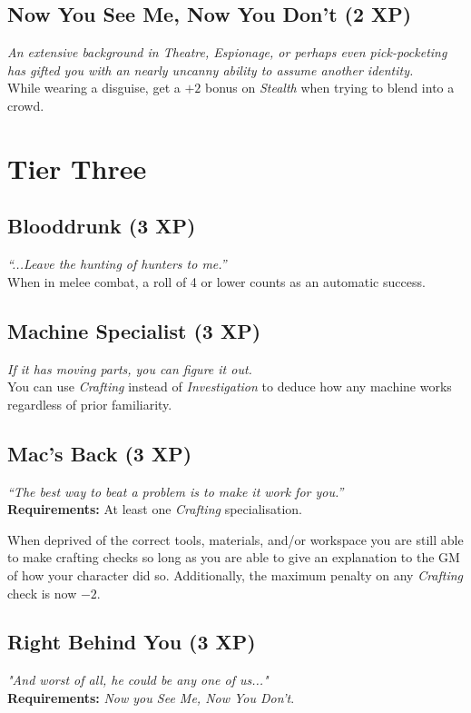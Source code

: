 \subsection{Now You See Me, Now You Don't (2 XP)}
\textit{An extensive background in Theatre, Espionage, or perhaps even pick-pocketing has gifted you with an nearly uncanny ability to assume another identity.}\\
While wearing a disguise, get a $+2$ bonus on \textit{Stealth} when trying to blend into a crowd.

\section{Tier Three}

\subsection{Blooddrunk (3 XP)}
\textit{``...Leave the hunting of hunters to me.''}\\
When in melee combat, a roll of 4 or lower counts as an automatic success.

\subsection{Machine Specialist (3 XP)}
\textit{If it has moving parts, you can figure it out.}\\
You can use \textit{Crafting} instead of \textit{Investigation} to deduce how any machine works regardless of prior familiarity.

\subsection{Mac's Back (3 XP)}
\textit{``The best way to beat a problem is to make it work for you.''}\\
\textbf{Requirements:} At least one \textit{Crafting} specialisation.

When deprived of the correct tools, materials, and/or workspace you are still able to make crafting checks so long as you are able to give an explanation to the GM of how your character did so.
Additionally, the maximum penalty on any \textit{Crafting} check is now $-2$.

\subsection{Right Behind You (3 XP)}
\textit{"And worst of all, he could be any one of us..."}\\
\textbf{Requirements:} \textit{Now you See Me, Now You Don't}.

